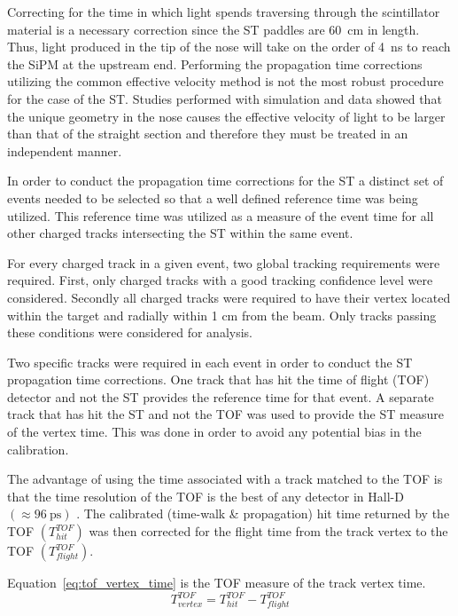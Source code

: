 {Correcting for the time in which light spends traversing through the scintillator material is a necessary correction since the ST paddles are 60~cm in length.  Thus, light produced in the tip of the nose will take on the order of 4~ns to reach the SiPM at the upstream end.  Performing the propagation time corrections utilizing the common effective velocity method is not the most robust procedure for the case of the ST.  Studies performed with simulation and data showed that the unique geometry in the nose causes the effective velocity of light to be larger than that of the straight section and therefore they must be treated in an independent manner.

In order to conduct the propagation time corrections for the ST a distinct set of events needed to be selected so that a well defined reference time was being utilized.  This reference time was utilized as a measure of the event time for all other charged tracks intersecting the ST within the same event.  

For every charged track in a given event, two global tracking requirements were required.  First, only charged tracks with a good tracking confidence level were considered.  Secondly all charged tracks were required to have their vertex located within the target and radially within 1 cm from the beam. Only tracks passing these conditions were considered for analysis.

Two specific tracks were required in each event in order to conduct the ST propagation time corrections.  One track that has hit the time of flight (TOF) detector and not the ST provides the reference time for that event.  A separate track that has hit the ST and not the TOF was used to provide the ST measure of the vertex time.  This was done in order to avoid any potential bias in the calibration.  
	
The advantage of using the time associated with a track matched to the TOF is that the time resolution of the TOF is the best of any detector in Hall-D $(\approx 96\ \mathrm{ps})$ \cite{zihlmann_tof}. The calibrated (time-walk \& propagation) hit time returned by the TOF $(T^{TOF}_{hit})$ was then corrected for the flight time from the track vertex to the TOF $(T^{TOF}_{flight})$.  

Equation~\ref{eq:tof_vertex_time} is the TOF measure of the track vertex time.
	\begin{equation} \label{eq:tof_vertex_time}
		T^{TOF}_{vertex} = T^{TOF}_{hit} - T^{TOF}_{flight}
	\end{equation}

}

